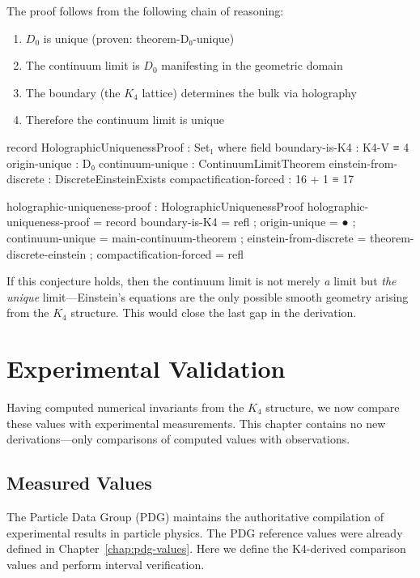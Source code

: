 \documentclass[11pt,a4paper]{book}
\def\texttt#1{#1}%
\begin{document}
The proof follows from the following chain of reasoning:
\begin{enumerate}
\item $D_0$ is unique (proven: \texttt{theorem-D₀-unique})
\item The continuum limit is $D_0$ manifesting in the geometric domain
\item The boundary (the $K_4$ lattice) determines the bulk via holography
\item Therefore the continuum limit is unique
\end{enumerate}

\begin{code}
record HolographicUniquenessProof : Set₁ where
  field
    boundary-is-K4 : K4-V ≡ 4
    origin-unique : D₀
    continuum-unique : ContinuumLimitTheorem
    einstein-from-discrete : DiscreteEinsteinExists
    compactification-forced : 16 + 1 ≡ 17

holographic-uniqueness-proof : HolographicUniquenessProof
holographic-uniqueness-proof = record
  { boundary-is-K4 = refl
  ; origin-unique = ●
  ; continuum-unique = main-continuum-theorem
  ; einstein-from-discrete = theorem-discrete-einstein
  ; compactification-forced = refl
  }
\end{code}

If this conjecture holds, then the continuum limit is not merely \emph{a} limit but 
\emph{the unique} limit---Einstein's equations are the only possible smooth geometry 
arising from the $K_4$ structure. This would close the last gap in the derivation.

\chapter{Experimental Validation}
\label{chap:validation}

Having computed numerical invariants from the $K_4$ structure, we now compare these values 
with experimental measurements. This chapter contains no new derivations---only 
comparisons of computed values with observations.

\section{Measured Values}

The Particle Data Group (PDG) maintains the authoritative compilation of experimental results 
in particle physics. The PDG reference values were already defined in Chapter~\ref{chap:pdg-values}.
Here we define the K4-derived comparison values and perform interval verification.
\end{document}
